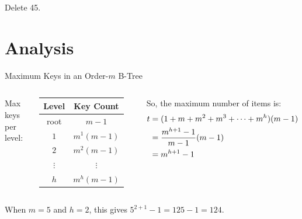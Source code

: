 \documentclass[14pt,aspectratio=1610]{beamer}
\begin{document}
\begin{frame}[b]{Delete 45.}
  \center%
  \centerline{%
  }
\pause{}
\vspace{1.85cm}
\end{frame}

\section{Analysis}

\begin{frame}{Maximum Keys in an Order-\(m\) B-Tree}
  \begin{columns}
    Max keys per level:\\
      \begin{tabular}{c c}
        \toprule
        Level & Key Count\\
        \midrule
      root    & \(m - 1\)\\
      \(1\) & \(m^1(m - 1)\)\\
      \(2\) & \(m^2(m - 1)\)\\
      \(\vdots\) & \multicolumn{1}{c}{\(\vdots\)} \\
      \(h\) & \(m^h(m - 1)\)\\
      \bottomrule
      \end{tabular}
  \pause{}
    So, the maximum number of items is:
    \begin{align*}\vspace{-1em}
      t &= (1 + m + m^2 + m^3 + \cdots + m^h)(m - 1)\\
        &= \frac{m^{h+1} - 1}{m - 1} (m - 1)\\
        &= m^{h+1} - 1
    \end{align*}
  \end{columns}\vspace{1em}
  \pause{}
  When \(m = 5\) and \(h = 2\), this gives \(5^{2 + 1} - 1 = 125 - 1 = 124\).
\end{frame}
\end{document}
